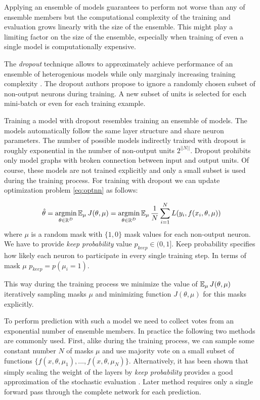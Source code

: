 Applying an ensemble of models guarantees to perform not worse than any of ensemble members but the computational complexity of the training and evaluation grows linearly with the size of the ensemble. This might play a limiting factor on the size of the ensemble, especially when training of even a single model is computationally expensive.

The \textit{dropout} technique allows to approximately achieve performance of an ensemble of heterogenious models while only marginaly increasing training complexity \cite{Srivastava2014}.
The dropout authors propose to ignore a randomly chosen subset of non-output neurons during training. A new subset of units is selected for each mini-batch or even for each training example.

Training a model with dropout resembles training an ensemble of models. The models automatically follow the same layer structure and share neuron parameters. The number of possible models indirectly trained with dropout is roughly exponential in the number of non-output units $2^{||N||}$. Dropout prohibits only model graphs with broken connection between input and output units. Of course, these models are not trained explicitly and only a small subset is used during the training process. For training with dropout we can update optimization problem \ref{eq:optnn} as follows:

\begin{equation}\label{eq:optnndo}
  \hat{\theta} = \operatorname*{argmin}_{\theta \in \Bbb{R}^D} \operatorname{\mathbb{E}}_\mu J(\theta, \mu) = \operatorname*{argmin}_{\theta \in \Bbb{R}^D} \operatorname{\mathbb{E}}_\mu \frac{1}{N} \sum_{i=1}^{N} L(y_i, f(x_i, \theta, \mu))
\end{equation}
where $\mu$ is a random mask with $\{1, 0\}$ mask values for each non-output neuron. We have to provide \textit{keep probability} value $p_{keep} \in (0, 1]$. Keep probability specifies how likely each neuron to participate in every single training step. In terms of mask $\mu$ $p_{keep}=p(\mu_i = 1)$.

This way during the training process we minimize the value of $\operatorname{\mathbb{E}}_\mu J(\theta, \mu)$ iteratively sampling masks $\mu$ and minimizing function $J(\theta, \mu)$ for this masks explicitly.

To perform prediction with such a model we need to collect votes from an exponential number of ensemble members.
In practice the following two methods are commonly used. First, alike during the training process, we can sample some constant number $N$ of masks $\mu$ and use majority vote on a small subset of functions $\{f(x, \theta, \mu_1), \ldots, f(x, \theta, \mu_N)\}$. Alternatively, it has been shown that simply scaling the weight of the layers by \textit{keep probability} provides a good approximation of the stochastic evaluation \cite{Srivastava2014}. Later method requires only a single forward pass through the complete network for each prediction.

